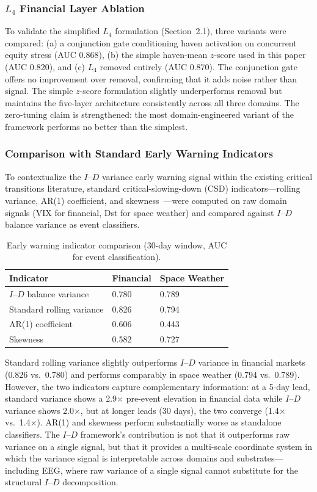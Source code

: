 \documentclass[12pt,a4paper]{article}
\begin{document}
\subsubsection{\label{sec:l4ablation}$L_4$ Financial Layer Ablation}

To validate the simplified $L_4$ formulation (Section~2.1), three variants were compared: (a) a conjunction gate conditioning haven activation on concurrent equity stress (AUC 0.868), (b) the simple haven-mean $z$-score used in this paper (AUC 0.820), and (c) $L_4$ removed entirely (AUC 0.870). The conjunction gate offers no improvement over removal, confirming that it adds noise rather than signal. The simple $z$-score formulation slightly underperforms removal but maintains the five-layer architecture consistently across all three domains. The zero-tuning claim is strengthened: the most domain-engineered variant of the framework performs no better than the simplest.

\subsubsection{Comparison with Standard Early Warning Indicators}

To contextualize the $I$--$D$ variance early warning signal within the existing critical transitions literature, standard critical-slowing-down (CSD) indicators---rolling variance, AR(1) coefficient, and skewness~\cite{dakos2012}---were computed on raw domain signals (VIX for financial, Dst for space weather) and compared against $I$--$D$ balance variance as event classifiers.

\begin{table}[H]
\caption{Early warning indicator comparison (30-day window, AUC for event classification).\label{tab:ews}}
\begin{tabular}{@{}lll@{}}
\toprule
Indicator & Financial & Space Weather \\
\midrule
$I$--$D$ balance variance & 0.780 & 0.789 \\
Standard rolling variance & 0.826 & 0.794 \\
AR(1) coefficient & 0.606 & 0.443 \\
Skewness & 0.582 & 0.727 \\
\bottomrule
\end{tabular}
\end{table}

Standard rolling variance slightly outperforms $I$--$D$ variance in financial markets (0.826 vs.\ 0.780) and performs comparably in space weather (0.794 vs.\ 0.789). However, the two indicators capture complementary information: at a 5-day lead, standard variance shows a 2.9$\times$ pre-event elevation in financial data while $I$--$D$ variance shows 2.0$\times$, but at longer leads (30 days), the two converge (1.4$\times$ vs.\ 1.4$\times$). AR(1) and skewness perform substantially worse as standalone classifiers. The $I$--$D$ framework's contribution is not that it outperforms raw variance on a single signal, but that it provides a multi-scale coordinate system in which the variance signal is interpretable across domains and substrates---including EEG, where raw variance of a single signal cannot substitute for the structural $I$--$D$ decomposition.
\end{document}

